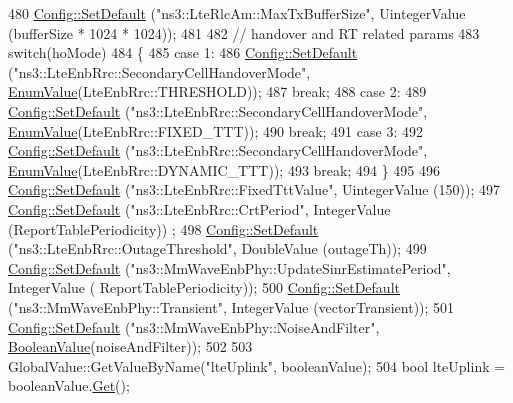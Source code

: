 \begin{DoxyCode}
{480   \hyperlink{group__config_ga2e7882df849d8ba4aaad31c934c40c06}{Config::SetDefault} (\textcolor{stringliteral}{"ns3::LteRlcAm::MaxTxBufferSize"}, UintegerValue (bufferSize * 1024 
      * 1024));
481 
482    \textcolor{comment}{// handover and RT related params}
483   \textcolor{keywordflow}{switch}(hoMode)
484   \{
485     \textcolor{keywordflow}{case} 1:
486         \hyperlink{group__config_ga2e7882df849d8ba4aaad31c934c40c06}{Config::SetDefault} (\textcolor{stringliteral}{"ns3::LteEnbRrc::SecondaryCellHandoverMode"}, 
      \hyperlink{classns3_1_1EnumValue}{EnumValue}(LteEnbRrc::THRESHOLD));
487         \textcolor{keywordflow}{break};
488     \textcolor{keywordflow}{case} 2:
489         \hyperlink{group__config_ga2e7882df849d8ba4aaad31c934c40c06}{Config::SetDefault} (\textcolor{stringliteral}{"ns3::LteEnbRrc::SecondaryCellHandoverMode"}, 
      \hyperlink{classns3_1_1EnumValue}{EnumValue}(LteEnbRrc::FIXED\_TTT));
490         \textcolor{keywordflow}{break};
491     \textcolor{keywordflow}{case} 3:
492         \hyperlink{group__config_ga2e7882df849d8ba4aaad31c934c40c06}{Config::SetDefault} (\textcolor{stringliteral}{"ns3::LteEnbRrc::SecondaryCellHandoverMode"}, 
      \hyperlink{classns3_1_1EnumValue}{EnumValue}(LteEnbRrc::DYNAMIC\_TTT));
493         \textcolor{keywordflow}{break};
494   \}
495   
496   \hyperlink{group__config_ga2e7882df849d8ba4aaad31c934c40c06}{Config::SetDefault} (\textcolor{stringliteral}{"ns3::LteEnbRrc::FixedTttValue"}, UintegerValue (150));
497   \hyperlink{group__config_ga2e7882df849d8ba4aaad31c934c40c06}{Config::SetDefault} (\textcolor{stringliteral}{"ns3::LteEnbRrc::CrtPeriod"}, IntegerValue (ReportTablePeriodicity))
      ;
498   \hyperlink{group__config_ga2e7882df849d8ba4aaad31c934c40c06}{Config::SetDefault} (\textcolor{stringliteral}{"ns3::LteEnbRrc::OutageThreshold"}, DoubleValue (outageTh));
499   \hyperlink{group__config_ga2e7882df849d8ba4aaad31c934c40c06}{Config::SetDefault} (\textcolor{stringliteral}{"ns3::MmWaveEnbPhy::UpdateSinrEstimatePeriod"}, IntegerValue (
      ReportTablePeriodicity));
500   \hyperlink{group__config_ga2e7882df849d8ba4aaad31c934c40c06}{Config::SetDefault} (\textcolor{stringliteral}{"ns3::MmWaveEnbPhy::Transient"}, IntegerValue (vectorTransient));
501   \hyperlink{group__config_ga2e7882df849d8ba4aaad31c934c40c06}{Config::SetDefault} (\textcolor{stringliteral}{"ns3::MmWaveEnbPhy::NoiseAndFilter"}, 
      \hyperlink{classns3_1_1BooleanValue}{BooleanValue}(noiseAndFilter));
502 
503   GlobalValue::GetValueByName(\textcolor{stringliteral}{"lteUplink"}, booleanValue);
504   \textcolor{keywordtype}{bool} lteUplink = booleanValue.\hyperlink{classns3_1_1BooleanValue_a15d5d96abfd11676964f40859442ec12}{Get}();
}
\end{DoxyCode}
